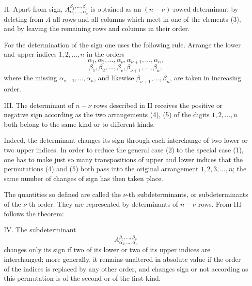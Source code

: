 \documentclass[11pt]{article}
\begin{document}
II. Apart from sign, \(A_{\alpha_1,\ldots,\alpha_\nu}^{\beta_1,\ldots,\beta_\nu}\) is obtained as an \((n-\nu)\)-rowed determinant by deleting from \(A\) all rows and all columns which meet in one of the elements (3), and by leaving the remaining rows and columns in their order.

For the determination of the sign one uses the following rule.  Arrange the lower and upper indices \(1,2,\ldots,n\) in the orders
\begin{equation}
        \alpha_1,\alpha_2,\ldots,\alpha_\nu,\alpha_{\nu+1},\ldots,\alpha_n,
\tag{4}
\end{equation}
\begin{equation}
        \beta_1,\beta_2,\ldots,\beta_\nu,\beta_{\nu+1},\ldots,\beta_n,
\tag{5}
\end{equation}
where the missing \(\alpha_{\nu+1},\ldots,\alpha_n\), and likewise \(\beta_{\nu+1},\ldots,\beta_n\), are taken in increasing order.

III. The determinant of \(n-\nu\) rows described in II receives the positive or negative sign according as the two arrangements (4), (5) of the digits \(1,2,\ldots,n\) both belong to the same kind or to different kinds.

Indeed, the determinant changes its sign through each interchange of two lower or two upper indices.  In order to reduce the general case (2) to the special case (1), one has to make just so many transpositions of upper and lower indices that the permutations (4) and (5) both pass into the original arrangement \(1,2,3,\ldots,n\); the same number of changes of sign has then taken place.

The quantities so defined are called the \(\nu\)-th subdeterminants, or subdeterminants of the \(\nu\)-th order.  They are represented by determinants of \(n-\nu\) rows.  From III follows the theorem:

IV. The subdeterminant
\[
        A_{\alpha_1,\ldots,\alpha_\nu}^{\beta_1,\ldots,\beta_\nu}
\]
changes only its sign if two of its lower or two of its upper indices are interchanged; more generally, it remains unaltered in absolute value if the order of the indices is replaced by any other order, and changes sign or not according as this permutation is of the second or of the first kind.
\end{document}
